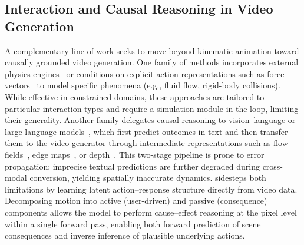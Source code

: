 \subsection{Interaction and Causal Reasoning in Video Generation}
A complementary line of work seeks to move beyond kinematic animation toward causally grounded video generation. One family of methods incorporates external physics engines~\cite{liu2024physgen, li2025wonderplay, chen2025physgen3d, montanaro2024motioncraft} or conditions on explicit action representations such as force vectors~\cite{gillman2025force} to model specific phenomena (e.g., fluid flow, rigid-body collisions). While effective in constrained domains, these approaches are tailored to particular interaction types and require a simulation module in the loop, limiting their generality. Another family delegates causal reasoning to vision--language or large language models~\cite{yang2025vlipp, pan2024vlp, lian2023llm, wu2024self}, which first predict outcomes in text and then transfer them to the video generator through intermediate representations such as flow fields~\cite{lv2024gpt4motion, montanaro2024motioncraft}, edge maps~\cite{lv2024gpt4motion}, or depth~\cite{lv2024gpt4motion, zhang2023adding}. This two-stage pipeline is prone to error propagation: imprecise textual predictions are further degraded during cross-modal conversion, yielding spatially inaccurate dynamics. \ours sidesteps both limitations by learning latent action--response structure directly from video data. Decomposing motion into active (user-driven) and passive (consequence) components allows the model to perform cause--effect reasoning at the pixel level within a single forward pass, enabling both forward prediction of scene consequences and inverse inference of plausible underlying actions.
